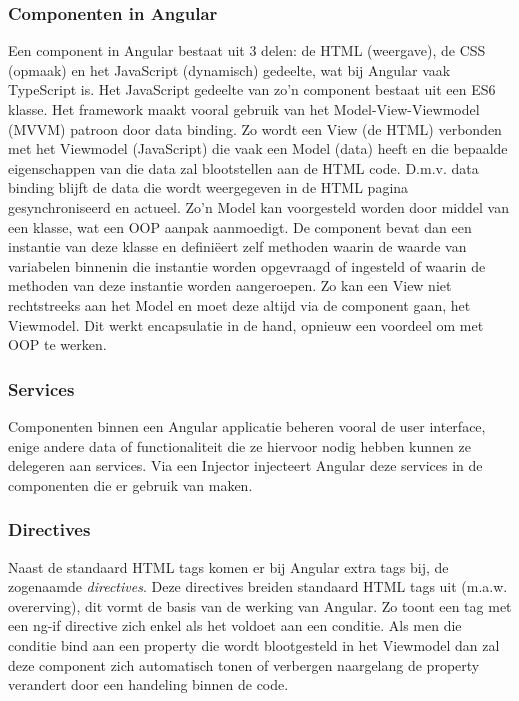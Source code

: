 \subsubsection{Componenten in Angular}
Een component in Angular bestaat uit 3 delen: de HTML (weergave), de CSS (opmaak) en het JavaScript (dynamisch) gedeelte, wat bij Angular vaak TypeScript is. Het JavaScript gedeelte van zo'n component bestaat uit een ES6 klasse. Het framework maakt vooral gebruik van het Model-View-Viewmodel (MVVM) patroon door data binding. Zo wordt een View (de HTML) verbonden met het Viewmodel (JavaScript) die vaak een Model (data) heeft en die bepaalde eigenschappen van die data zal blootstellen aan de HTML code. D.m.v. data binding blijft de data die wordt weergegeven in de HTML pagina gesynchroniseerd en actueel. Zo'n Model kan voorgesteld worden door middel van een klasse, wat een OOP aanpak aanmoedigt. De component bevat dan een instantie van deze klasse en definiëert zelf methoden waarin de waarde van variabelen binnenin die instantie worden opgevraagd of ingesteld of waarin de methoden van deze instantie worden aangeroepen. Zo kan een View niet rechtstreeks aan het Model en moet deze altijd via de component gaan, het Viewmodel. Dit werkt encapsulatie in de hand, opnieuw een voordeel om met OOP te werken.

\subsubsection{Services}
Componenten binnen een Angular applicatie beheren vooral de user interface, enige andere data of functionaliteit die ze hiervoor nodig hebben kunnen ze delegeren aan services. Via een Injector injecteert Angular deze services in de componenten die er gebruik van maken. 

\subsubsection{Directives}
Naast de standaard HTML tags komen er bij Angular extra tags bij, de zogenaamde \textit{directives}. Deze directives breiden standaard HTML tags uit (m.a.w. overerving), dit vormt de basis van de werking van Angular. Zo toont een tag met een ng-if directive zich enkel als het voldoet aan een conditie. Als men die conditie bind aan een property die wordt blootgesteld in het Viewmodel dan zal deze component zich automatisch tonen of verbergen naargelang de property verandert door een handeling binnen de code.  

